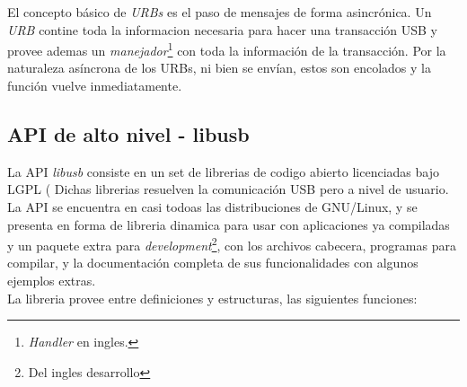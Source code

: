 El concepto b\'asico de \emph{URBs} es el paso de mensajes de forma
asincr\'onica. 
Un \emph{URB} contine toda la informacion necesaria para hacer una
transacci\'on USB y provee ademas un \emph{manejador}\footnote{\emph{Handler}
en ingles.} con toda la informaci\'on de la transacci\'on.
Por la naturaleza as\'incrona de los URBs, ni bien se env\'ian, estos son
encolados y la funci\'on vuelve inmediatamente. 



\subsection{API de alto nivel - libusb}

La API \emph{libusb} consiste en un set de librerias de codigo abierto
licenciadas bajo LGPL (%
Dichas librerias resuelven la comunicaci\'on
USB pero a nivel de usuario.
La API se encuentra en casi todoas las distribuciones de GNU/Linux, y se
presenta en forma de libreria dinamica para usar con aplicaciones ya
compiladas y un paquete extra para \emph{development}\footnote{Del ingles
desarrollo}, con los archivos cabecera, programas para compilar, y
la documentaci\'on completa de sus funcionalidades con algunos ejemplos
extras. \\

La libreria provee entre definiciones y estructuras, las siguientes funciones:



